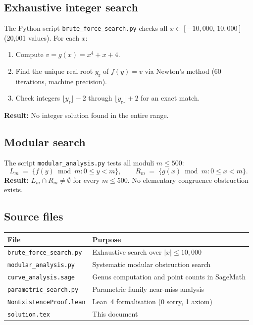 \documentclass[12pt, a4paper]{article}
\theoremstyle{definition}
\begin{document}
\subsection{Exhaustive integer search}

The Python script \texttt{brute\_force\_search.py} checks all
$x \in [-10{,}000,\, 10{,}000]$ (20,001 values).  For each $x$:
\begin{enumerate}[noitemsep]
  \item Compute $v = g(x) = x^4 + x + 4$.
  \item Find the unique real root $y_{\mathrm{r}}$ of $f(y) = v$ via Newton's method
        (60 iterations, machine precision).
  \item Check integers $\lfloor y_{\mathrm{r}} \rfloor - 2$ through
        $\lfloor y_{\mathrm{r}} \rfloor + 2$ for an exact match.
\end{enumerate}
\textbf{Result:} No integer solution found in the entire range.

\subsection{Modular search}

The script \texttt{modular\_analysis.py} tests all moduli $m \leq 500$:
\[
  L_m \;=\; \{f(y) \bmod m : 0 \leq y < m\}, \qquad
  R_m \;=\; \{g(x) \bmod m : 0 \leq x < m\}.
\]
\textbf{Result:} $L_m \cap R_m \neq \emptyset$ for every $m \leq 500$.
No elementary congruence obstruction exists.

\subsection{Source files}

\begin{center}
\renewcommand{\arraystretch}{1.2}
\begin{tabular}{ll}
\toprule
\textbf{File} & \textbf{Purpose} \\
\midrule
\texttt{brute\_force\_search.py}     & Exhaustive search over $|x| \leq 10{,}000$ \\
\texttt{modular\_analysis.py}        & Systematic modular obstruction search \\
\texttt{curve\_analysis.sage}        & Genus computation and point counts in SageMath \\
\texttt{parametric\_search.py}       & Parametric family near-miss analysis \\
\texttt{NonExistenceProof.lean}      & Lean~4 formalisation (0 sorry, 1 axiom) \\
\texttt{solution.tex}               & This document \\
\bottomrule
\end{tabular}
\end{center}
\end{document}

